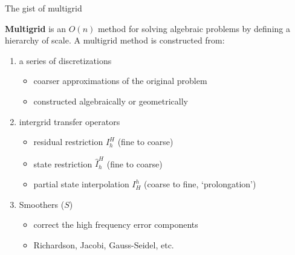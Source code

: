 \documentclass{beamer}
\begin{document}
\begin{frame}[fragile]{The gist of multigrid}
\begin{figure}
    \label{fig:levels}
  \end{figure}
  \textbf{Multigrid} is an $O(n)$ method for solving algebraic problems by defining a hierarchy of scale.
  A multigrid method is constructed from:
  \begin{enumerate}
  \item a series of discretizations
    \begin{itemize}
    \item coarser approximations of the original problem
    \item constructed algebraically or geometrically
    \end{itemize}
  \item intergrid transfer operators
    \begin{itemize}
    \item residual restriction $I_h^H$ (fine to coarse)
    \item state restriction $\hat I_h^H$ (fine to coarse)
    \item partial state interpolation $I_H^h$ (coarse to fine, `prolongation')
    \end{itemize}
  \item Smoothers ($S$)
    \begin{itemize}
    \item correct the high frequency error components
    \item Richardson, Jacobi, Gauss-Seidel, etc.
    \end{itemize}
  \end{enumerate}
\end{frame}
\end{document}
